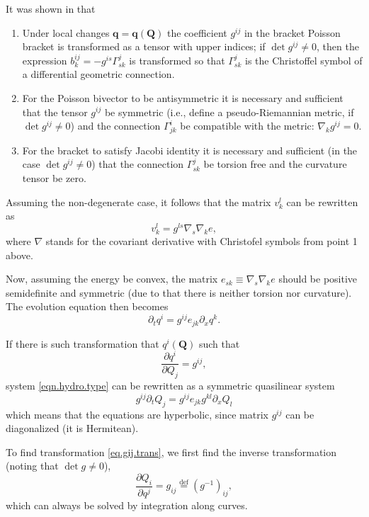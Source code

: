 \documentclass[
10pt, %
a4paper, %
oneside, %
headinclude,footinclude, %
BCOR5mm, %
]{scrartcl}
\newcommand{\qq}{\mathbf{q}}
\newcommand{\QQ}{\mathbf{Q}}
\begin{document}
It was shown in \cite{Novikov} that
\begin{enumerate}
\item Under local changes $\qq = \qq(\QQ)$ the coefficient $g^{ij}$ in the bracket
		Poisson bracket is transformed as a tensor with upper indices; if $\det g^{ij} \neq 0$, then the expression
		$b^{ij}_k = -g^{is}\Gamma^j_{sk}$ is transformed so that $\Gamma^j_{sk}$ is the Christoffel symbol of a differential
geometric connection.
\item  For the Poisson bivector to be antisymmetric it is necessary and sufficient that the
	tensor $g^{ij}$ be symmetric (i.e., define a pseudo-Riemannian metric, if $\det g^{ij} \neq 0$) and
		the connection $\Gamma^i_{jk}$ be compatible with the metric: $\nabla_k g^{ij} = 0$.
	\item  For the bracket to satisfy Jacobi identity it is necessary and sufficient (in the case $\det g^{ij} \neq 0 $) that the connection $\Gamma^{j}_{sk}$ be torsion free and the curvature tensor be zero.
\end{enumerate}
Assuming the non-degenerate case, it follows that the matrix $v^l_k$ can be rewritten as
\begin{equation}
	v^l_k = g^{ls}\nabla_s \nabla_k e,
\end{equation}
where $\nabla$ stands for the covariant derivative with Christofel symbols from point 1 above.

Now, assuming the energy be convex, the matrix $e_{sk}\equiv \nabla_s \nabla_k e$ should be positive semidefinite and symmetric (due to that there is neither torsion nor curvature). The evolution equation then becomes
\begin{equation}
	\partial_t q^i = g^{ij} e_{jk}\partial_x q^k.
\end{equation}


If there is such transformation that $q^i(\QQ)$ such that 
\begin{equation}\label{eq.gij.trans}
 \frac{\partial q^i}{\partial Q_j} = g^{ij},
\end{equation}
system \eqref{eqn.hydro.type} can be rewritten as a symmetric quasilinear system
\begin{equation}
	g^{ij}\partial_t Q_j = g^{ij} e_{jk} g^{kl} \partial_x Q_l
\end{equation}
which means that the equations are hyperbolic, since matrix $g^{ij}$ can be diagonalized (it is Hermitean). 

To find transformation \eqref{eq.gij.trans}, we first find the inverse transformation (noting that $\det g\neq 0$), 
\begin{equation}
    \frac{\partial Q_i}{\partial q^j}=g_{ij}\stackrel{\mathrm{def}}{=}(g^{-1})_{ij},
\end{equation}
which can always be solved by integration along curves. 
\end{document}
